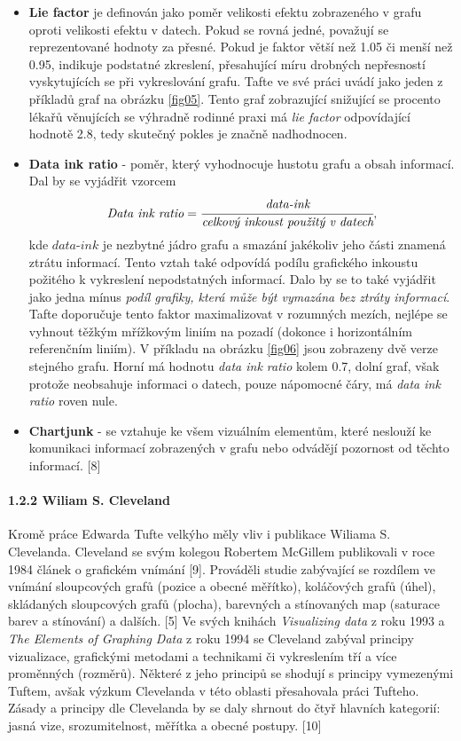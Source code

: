 \documentclass[12pt,]{article}
\let\oldparagraph\paragraph
\renewcommand{\paragraph}[1]{\oldparagraph{#1}\mbox{}}
\begin{document}
\begin{itemize}
\item
  \textbf{Lie factor} je definován jako poměr velikosti efektu
  zobrazeného v grafu oproti velikosti efektu v datech. Pokud se rovná
  jedné, považují se reprezentované hodnoty za přesné. Pokud je faktor
  větší než 1.05 či menší než 0.95, indikuje podstatné zkreslení,
  přesahující míru drobných nepřesností vyskytujících se při
  vykreslování grafu. Tafte ve své práci uvádí jako jeden z příkladů
  graf na obrázku \ref{fig05}. Tento graf zobrazující snižující se
  procento lékařů věnujících se výhradně rodinné praxi má \emph{lie
  factor} odpovídající hodnotě 2.8, tedy skutečný pokles je značně
  nadhodnocen.
\item
  \textbf{Data ink ratio} - poměr, který vyhodnocuje hustotu grafu a
  obsah informací. Dal by se vyjádřit vzorcem
  \[\textit{Data ink ratio} = \cfrac{\textit{data-ink}}{\textit{celkový inkoust použitý v datech}},\]
  kde \(\textit{data-ink}\) je nezbytné jádro grafu a smazání jakékoliv
  jeho části znamená ztrátu informací. Tento vztah také odpovídá podílu
  grafického inkoustu požitého k vykreslení nepodstatných informací.
  Dalo by se to také vyjádřit jako jedna mínus
  \textit{podíl grafiky, která může být vymazána bez ztráty informací}.
  Tafte doporučuje tento faktor maximalizovat v rozumných mezích,
  nejlépe se vyhnout těžkým mřížkovým liniím na pozadí (dokonce i
  horizontálním referenčním liniím). V příkladu na obrázku \ref{fig06}
  jsou zobrazeny dvě verze stejného grafu. Horní má hodnotu \emph{data
  ink ratio} kolem 0.7, dolní graf, však protože neobsahuje informaci o
  datech, pouze nápomocné čáry, má \emph{data ink ratio} roven nule.
\item
  \textbf{Chartjunk} - se vztahuje ke všem vizuálním elementům, které
  neslouží ke komunikaci informací zobrazených v grafu nebo odvádějí
  pozornost od těchto informací. {[}8{]}
\end{itemize}

\hypertarget{cleveland}{\paragraph{1.2.2 Wiliam S.
Cleveland}\label{cleveland}}

\qquad Kromě práce Edwarda Tufte velkýho měly vliv i publikace Wiliama
S. Clevelanda. Cleveland se svým kolegou Robertem McGillem publikovali v
roce 1984 článek o grafickém vnímání {[}9{]}. Prováděli studie
zabývající se rozdílem ve vnímání sloupcových grafů (pozice a obecné
měřítko), koláčových grafů (úhel), skládaných sloupcových grafů
(plocha), barevných a stínovaných map (saturace barev a stínování) a
dalších. {[}5{]} Ve svých knihách \emph{Visualizing data} z roku 1993 a
\emph{The Elements of Graphing Data} z roku 1994 se Cleveland zabýval
principy vizualizace, grafickými metodami a technikami či vykreslením
tří a více proměnných (rozměrů). Některé z jeho principů se shodují s
principy vymezenými Tuftem, avšak výzkum Clevelanda v této oblasti
přesahovala práci Tufteho. Zásady a principy dle Clevelanda by se daly
shrnout do čtyř hlavních kategorií: jasná vize, srozumitelnost, měřítka
a obecné postupy. {[}10{]}
\end{document}
